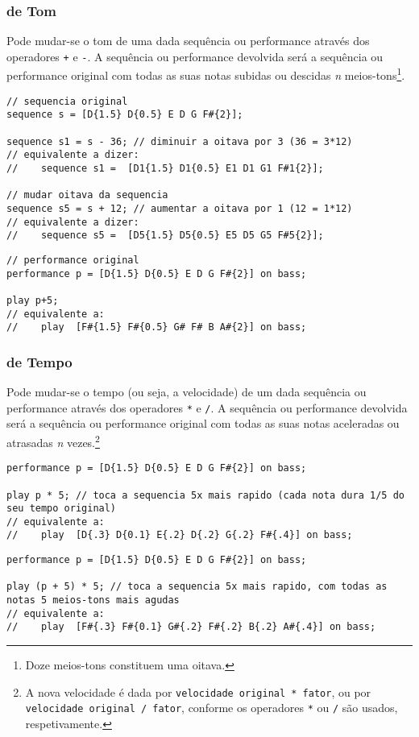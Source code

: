 \documentclass{article}
\begin{document}
\subsubsection{de Tom}
Pode mudar-se o tom de uma dada sequência ou performance através dos operadores \texttt{+} e \texttt{-}. A sequência ou performance devolvida será a sequência ou performance original com todas as suas notas subidas ou descidas \textit{n} meios-tons\footnote{Doze meios-tons constituem uma oitava.}.
\begin{lstlisting} 
// sequencia original
sequence s = [D{1.5} D{0.5} E D G F#{2}];

sequence s1 = s - 36; // diminuir a oitava por 3 (36 = 3*12)
// equivalente a dizer:
//    sequence s1 =  [D1{1.5} D1{0.5} E1 D1 G1 F#1{2}];

// mudar oitava da sequencia
sequence s5 = s + 12; // aumentar a oitava por 1 (12 = 1*12)
// equivalente a dizer:
//    sequence s5 =  [D5{1.5} D5{0.5} E5 D5 G5 F#5{2}];
\end{lstlisting}
\begin{lstlisting} 
// performance original
performance p = [D{1.5} D{0.5} E D G F#{2}] on bass;

play p+5;
// equivalente a:
//    play  [F#{1.5} F#{0.5} G# F# B A#{2}] on bass;
\end{lstlisting}

\subsubsection{de Tempo}
Pode mudar-se o tempo (ou seja, a velocidade) de um dada sequência ou performance através dos operadores \texttt{*} e \texttt{/}. A sequência ou performance devolvida será a sequência ou performance original com todas as suas notas aceleradas ou atrasadas \textit{n} vezes.\footnote{A nova velocidade é dada por \texttt{velocidade original * fator}, ou por \texttt{velocidade original / fator}, conforme os operadores \texttt{*} ou \texttt{/} são usados, respetivamente.}
\begin{lstlisting} 
performance p = [D{1.5} D{0.5} E D G F#{2}] on bass;

play p * 5; // toca a sequencia 5x mais rapido (cada nota dura 1/5 do seu tempo original)
// equivalente a:
//    play  [D{.3} D{0.1} E{.2} D{.2} G{.2} F#{.4}] on bass;
\end{lstlisting}

\begin{lstlisting} 
performance p = [D{1.5} D{0.5} E D G F#{2}] on bass;

play (p + 5) * 5; // toca a sequencia 5x mais rapido, com todas as notas 5 meios-tons mais agudas
// equivalente a:
//    play  [F#{.3} F#{0.1} G#{.2} F#{.2} B{.2} A#{.4}] on bass;
\end{lstlisting}
\end{document}
